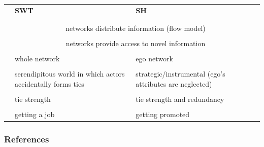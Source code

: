 \documentclass[8pt]{beamer}
\begin{document}


\begin{frame}
\frametitle{\insertsection}

\footnotesize
\begin{table}
\begin{tabular}{lp{4cm}|p{4cm}}
\toprule
                        & \textbf{SWT}                            & \textbf{SH}\\
                        & \cite{Granovetter1973}                  & \cite{Burt1992}\\
\hline
\\
{\color{blue}{Assumption}}   & \multicolumn{2}{c}{networks distribute information (flow model)}\\
\\
{\color{blue}{Focus}}        & \multicolumn{2}{c}{networks provide access to novel information}\\
\\
{\color{blue}{Network}}                 & whole network           & ego network\\
& &\\
{\color{blue}{Agency}}                  & serendipitous world in which actors accidentally forms ties     & strategic/instrumental (ego's attributes are neglected)\\
& &\\
{\color{blue}{Mechanisms}}              & tie strength            & tie strength and redundancy\\
& &\\
{\color{blue}{Seminal evidence}}        & getting a job           & getting promoted\\
\bottomrule
\end{tabular}
\end{table}

\end{frame}



\bgroup
{}
\begin{frame}[plain]{}
\begin{center}
\color{white}{\Huge Questions}
\end{center}
\end{frame}
\egroup




\begin{frame}[allowframebreaks]
\frametitle{References}
\tiny


\end{frame}
\end{document}
